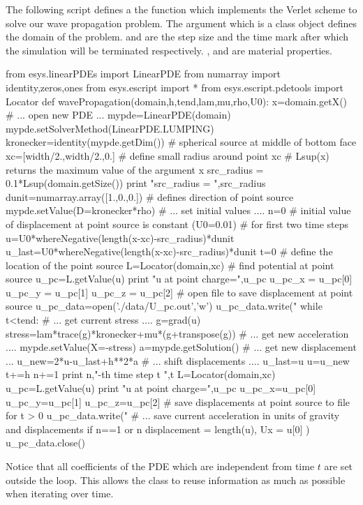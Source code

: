  
The following script defines a the function  which
implements the Verlet scheme to solve our wave propagation problem. 
The argument  which is a \Domain class object
defines the domain of the problem.  and  are the step size
and the time mark after which the simulation will be terminated respectively. ,  and 
 are material properties. 
\begin{python}
from esys.linearPDEs import LinearPDE
from numarray import identity,zeros,ones
from esys.escript import *
from esys.escript.pdetools import Locator
def wavePropagation(domain,h,tend,lam,mu,rho,U0):
   x=domain.getX()
   # ... open new PDE ...
   mypde=LinearPDE(domain)
   mypde.setSolverMethod(LinearPDE.LUMPING)
   kronecker=identity(mypde.getDim())
   #  spherical source at middle of bottom face
   xc=[width/2.,width/2.,0.] 
   # define small radius around point xc
   # Lsup(x) returns the maximum value of the argument x
   src_radius = 0.1*Lsup(domain.getSize())
   print "src_radius = ",src_radius
   dunit=numarray.array([1.,0.,0.]) # defines direction of point source
   mypde.setValue(D=kronecker*rho)
   # ... set initial values ....
   n=0
   # initial value of displacement at point source is constant (U0=0.01)
   # for first two time steps
   u=U0*whereNegative(length(x-xc)-src_radius)*dunit
   u_last=U0*whereNegative(length(x-xc)-src_radius)*dunit
   t=0
   # define the location of the point source
   L=Locator(domain,xc)
   # find potential at point source
   u_pc=L.getValue(u)
   print "u at point charge=",u_pc
   u_pc_x = u_pc[0]
   u_pc_y = u_pc[1]
   u_pc_z = u_pc[2]
   # open file to save displacement at point source
   u_pc_data=open('./data/U_pc.out','w')
   u_pc_data.write("%
   while t<tend:
     # ... get current stress ....
     g=grad(u)
     stress=lam*trace(g)*kronecker+mu*(g+transpose(g))
     # ... get new acceleration ....
     mypde.setValue(X=-stress)
     a=mypde.getSolution()
     # ... get new displacement ...
     u_new=2*u-u_last+h**2*a
     # ... shift displacements ....
     u_last=u
     u=u_new
     t+=h
     n+=1
     print n,"-th time step t ",t
     L=Locator(domain,xc)
     u_pc=L.getValue(u)
     print "u at point charge=",u_pc
     u_pc_x=u_pc[0]
     u_pc_y=u_pc[1]
     u_pc_z=u_pc[2]
     # save displacements at point source to file for t > 0
     u_pc_data.write("%
     # ... save current acceleration in units of gravity and displacements
     if n==1 or n%
     displacement = length(u), Ux = u[0] )
   u_pc_data.close()
\end{python}
Notice that 
all coefficients of the PDE which are independent from time $t$ are set outside the  
loop. This allows the \LinearPDE class to reuse information as much as possible 
when iterating over time.  
 
